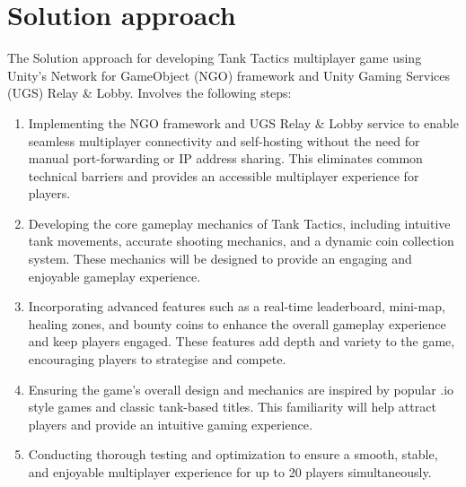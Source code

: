 \section{Solution approach}
\label{sec:intro_sol} %
The Solution approach for developing Tank Tactics multiplayer game using Unity's Network for GameObject (NGO) framework and Unity Gaming Services (UGS) Relay \& Lobby. Involves the following steps:
\begin{enumerate}
    \item Implementing the NGO framework and UGS Relay \& Lobby service to enable seamless multiplayer connectivity and self-hosting without the need for manual port-forwarding or IP address sharing. This eliminates common technical barriers and provides an accessible multiplayer experience for players.
    \item Developing the core gameplay mechanics of Tank Tactics, including intuitive tank movements, accurate shooting mechanics, and a dynamic coin collection system. These mechanics will be designed to provide an engaging and enjoyable gameplay experience.
    \item Incorporating advanced features such as a real-time leaderboard, mini-map, healing zones, and bounty coins to enhance the overall gameplay experience and keep players engaged. These features add depth and variety to the game, encouraging players to strategise and compete.
    \item Ensuring the game's overall design and mechanics are inspired by popular .io style games and classic tank-based titles. This familiarity will help attract players and provide an intuitive gaming experience.
    \item Conducting thorough testing and optimization to ensure a smooth, stable, and enjoyable multiplayer experience for up to 20 players simultaneously.
\end{enumerate}



